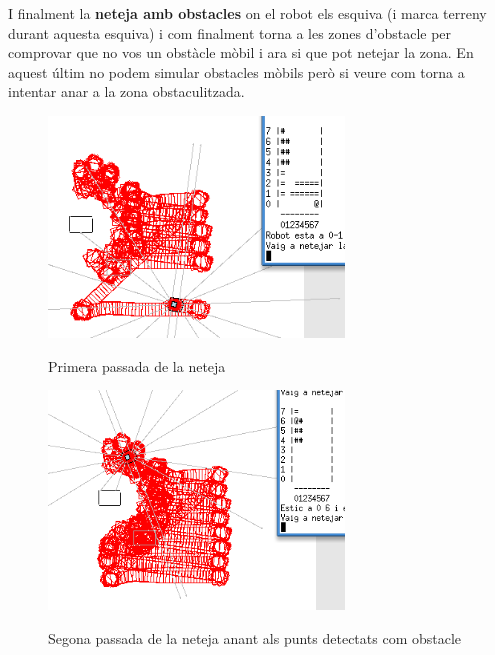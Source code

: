 I finalment la \textbf{neteja amb obstacles} on el robot els esquiva (i marca terreny durant aquesta esquiva)
i com finalment torna a les zones d'obstacle per comprovar que no vos un obstàcle mòbil i ara si que
pot netejar la zona. En aquest últim no podem simular obstacles mòbils però si veure com torna a intentar
anar a la zona obstaculitzada.

\begin{figure}[H]
\begin{center}\label{netejaobs}
 \includegraphics[width=0.7\textwidth]{diagrames/figures/netejant.png}
\end{center}
  \caption{Primera passada de la neteja}
\end{figure}

\begin{figure}[H]
\begin{center}\label{figescenari}
 \includegraphics[width=0.7\textwidth]{diagrames/figures/netejant-aobstacles.png}
\end{center}
  \caption{Segona passada de la neteja anant als punts detectats com obstacle}
\end{figure}

